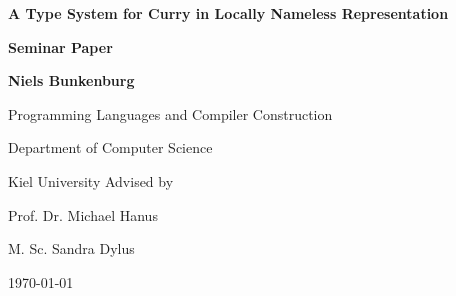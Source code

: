 \documentclass[a4paper, 11pt, fleqn]{scrreprt}
\begin{document}

\begin{titlepage}
	\vspace*{3cm}
	\centering
	{\huge\bfseries A Type System for Curry in Locally Nameless Representation \par}
	\vspace{1cm}
	\textbf{Seminar Paper} \par 
	\vspace{6cm}
	\textbf{Niels Bunkenburg} \par
	Programming Languages and Compiler Construction \par
	Department of Computer Science \par
	Kiel University
	\vfill
	Advised by\par
	Prof. Dr. Michael Hanus \par
	M. Sc. Sandra Dylus
	\vfill
	{\large \today\par}
\end{titlepage}
\begin{comment}
\chapter*{Erklärung der Urheberschaft}
\vspace{2cm}
Ich erkläre hiermit an Eides statt, dass ich die vorliegende Arbeit
ohne Hilfe Dritter und ohne Benutzung anderer als der angegebenen
Hilfsmittel angefertigt habe. Aus fremden Quellen direkt oder
indirekt übernommene Gedanken sind als solche kenntlich gemacht. Die
Arbeit wurde bisher in gleicher oder ähnlicher Form in keiner anderen
Prüfungsbehörde vorgelegt und auch noch nicht veröffentlicht.

\vspace{4cm}
\hspace{1cm} $\overline{~~~~~~~~~~\mbox{Ort, Datum}~~~~~~~~~~}$ \hfill $\overline{~~~~~~~~~~~~~\mbox{Unterschrift}~~~~~~~~~~~~~}$ \hspace{1cm}

\newpage
\mbox{}
\thispagestyle{empty}
\newpage
\end{comment}
\renewcommand{\contentsname}{Contents}
\tableofcontents   %
\end{document}
